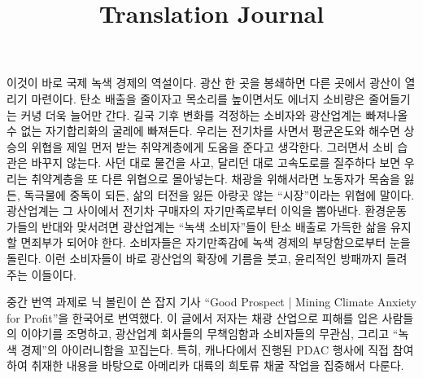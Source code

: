 \documentclass{translation}
\begin{document}
이것이 바로 국제 녹색 경제의 역설이다.
광산 한 곳을 봉쇄하면 다른 곳에서 광산이 열리기 마련이다.
탄소 배출을 줄이자고 목소리를 높이면서도 에너지 소비량은 줄어들기는 커녕 더욱 늘어만 간다.
길국 기후 변화를 걱정하는 소비자와 광산업계는 빠져나올 수 없는 자기합리화의 굴레에 빠져든다.
우리는 전기차를 사면서 평균온도와 해수면 상승의 위협을 제일 먼저 받는 취약계층에게 도움을 준다고 생각한다.
그러면서 소비 습관은 바꾸지 않는다.
사던 대로 물건을 사고, 달리던 대로 고속도로를 질주하다 보면 우리는 취약계층을 또 다른 위협으로 몰아넣는다.
채광을 위해서라면 노동자가 목숨을 잃든, 독극물에 중독이 되든, 삶의 터전을 잃든 아랑곳 않는 ``시장''이라는 위협에 말이다.
광산업계는 그 사이에서 전기차 구매자의 자기만족로부터 이익을 뽑아낸다.
환경운동가들의 반대와 맞서려면 광산업계는 ``녹색 소비자''들이 탄소 배출로 가득한 삶을 유지할 면죄부가 되어야 한다. 
소비자들은 자기만족감에 녹색 경제의 부당함으로부터 눈을 돌린다.
이런 소비자들이 바로 광산업의 확장에 기름을 붓고, 윤리적인 방패까지 들려 주는 이들이다.
%

\newpage

\title{Translation Journal}
\maketitle
중간 번역 과제로 닉 볼린이 쓴 잡지 기사 ``Good Prospect | Mining Climate Anxiety for Profit''을 한국어로 번역했다.
이 글에서 저자는 채광 산업으로 피해를 입은 사람들의 이야기를 조명하고, 광산업계 회사들의 무책임함과 소비자들의 무관심, 그리고 ``녹색 경제''의 아이러니함을 꼬집는다.
특히, 캐나다에서 진행된 PDAC 행사에 직접 참여하여 취재한 내용을 바탕으로 아메리카 대륙의 희토류 채굴 작업을 집중해서 다룬다.
\end{document}
